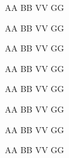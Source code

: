 \documentclass{article}
\begin{document}
AA BB VV GG
\begin{flushright}
AA BB VV GG
\end{flushright}
{\raggedleft AA BB VV GG\par}


\begin{center}
     AA BB VV GG
\end{center}
{\centering AA BB VV GG\par}
\centerline{AA BB VV GG}

\begin{flushleft}
     AA BB VV GG
\end{flushleft}
{\raggedright AA BB VV GG \par}
\end{document}
